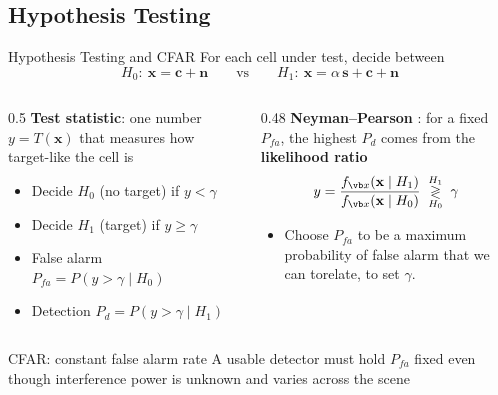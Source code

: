 \documentclass{beamer}
\begin{document}
\subsection{Hypothesis Testing}
\begin{frame}{Hypothesis Testing and CFAR}
    \small
    For each cell under test, decide between
    \[ H_0:\ \mathbf{x} = \mathbf{c} + \mathbf{n} \qquad\text{vs}\qquad
       H_1:\ \mathbf{x} = \alpha\,\mathbf{s} + \mathbf{c} + \mathbf{n} \]
    \vspace{-3mm}
    \begin{columns}[T]
        \begin{column}{0.5\textwidth}
            \textbf{Test statistic}: one number $y = T(\mathbf{x})$ that measures how target-like the cell is
            \begin{itemize}
                \item Decide $H_0$ (no target) if $y < \gamma$
                \item Decide $H_1$ (target) if $y \geq \gamma$
                \item False alarm $P_{fa} = P(y > \gamma \mid H_0)$
                \item Detection $P_d = P(y > \gamma \mid H_1)$
            \end{itemize}
        \end{column}
        \begin{column}{0.48\textwidth}
            \textbf{Neyman--Pearson} \cite{Neyman1933}: for a fixed $P_{fa}$, the highest $P_d$ comes from the \textbf{likelihood ratio}
            \[y = \frac{f_{\vb x}(\mathbf{x}\mid H_1)}{f_{\vb x}(\mathbf{x}\mid H_0)} \;\underset{H_0}{\overset{H_1}{\gtrless}}\; \gamma \]
            \vspace{-2mm}
            \begin{itemize}
                \item Choose $P_{fa}$ to be a maximum probability of false alarm that we can torelate, to set $\gamma$.
            \end{itemize}
        \end{column}
    \end{columns}
    \begin{block}{CFAR: constant false alarm rate}
        A usable detector must hold $P_{fa}$ fixed even though interference power is unknown and varies across the scene
    \end{block}
\end{frame}

\end{document}

